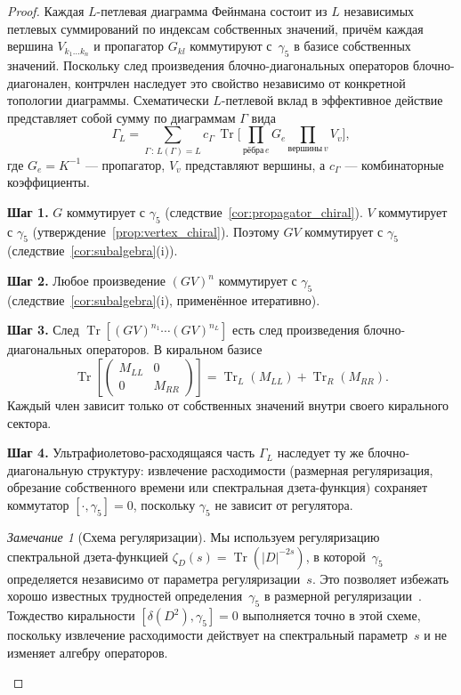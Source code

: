 \documentclass[12pt,a4paper]{article}
\theoremstyle{definition}
\theoremstyle{remark}
\newtheorem{remark}[theorem]{Замечание}
\newcommand{\Tr}{\operatorname{Tr}}
\begin{document}
\begin{proof}
Каждая $L$-петлевая диаграмма Фейнмана состоит из $L$ независимых
петлевых суммирований по индексам собственных значений, причём каждая
вершина $V_{k_1 \ldots k_n}$ и пропагатор $G_{kl}$ коммутируют
с~$\gamma_5$ в базисе собственных значений.  Поскольку след
произведения блочно-диагональных операторов блочно-диагонален,
контрчлен наследует это свойство независимо от конкретной топологии
диаграммы.  Схематически $L$-петлевой вклад в эффективное действие
представляет собой сумму по диаграммам $\Gamma$ вида
\begin{equation}\label{eq:L_loop}
  \Gamma_L = \sum_{\Gamma\,:\,L(\Gamma)=L}
  c_\Gamma\,\Tr\!\bigl[\prod_{\text{рёбра}\,e} G_e
  \prod_{\text{вершины}\,v} V_v\bigr],
\end{equation}
где $G_e = K^{-1}$ --- пропагатор, $V_v$ представляют вершины, а
$c_\Gamma$ --- комбинаторные коэффициенты.

\medskip\noindent\textbf{Шаг 1.}
$G$ коммутирует с $\gamma_5$ (следствие~\ref{cor:propagator_chiral}).
$V$ коммутирует с $\gamma_5$ (утверждение~\ref{prop:vertex_chiral}).
Поэтому $GV$ коммутирует с $\gamma_5$
(следствие~\ref{cor:subalgebra}(i)).

\medskip\noindent\textbf{Шаг 2.}
Любое произведение $(GV)^n$ коммутирует с $\gamma_5$
(следствие~\ref{cor:subalgebra}(i), применённое итеративно).

\medskip\noindent\textbf{Шаг 3.}
След $\Tr[(GV)^{n_1}\cdots(GV)^{n_L}]$ есть след произведения
блочно-диагональных операторов.  В киральном базисе
\begin{equation}\label{eq:block_trace}
  \Tr\!\left[\begin{pmatrix} M_{LL} & 0 \\ 0 & M_{RR}\end{pmatrix}\right]
  = \Tr_L(M_{LL}) + \Tr_R(M_{RR}).
\end{equation}
Каждый член зависит только от собственных значений внутри своего
кирального сектора.

\medskip\noindent\textbf{Шаг 4.}
Ультрафиолетово-расходящаяся часть $\Gamma_L$ наследует ту же
блочно-диагональную структуру: извлечение расходимости (размерная
регуляризация, обрезание собственного времени или спектральная
дзета-функция) сохраняет коммутатор $[\cdot, \gamma_5] = 0$, поскольку
$\gamma_5$ не зависит от регулятора.

\begin{remark}[Схема регуляризации]\label{rem:regularization}
Мы используем регуляризацию спектральной дзета-функцией
$\zeta_D(s) = \Tr(|D|^{-2s})$, в которой~$\gamma_5$ определяется
независимо от параметра регуляризации~$s$.  Это позволяет избежать
хорошо известных трудностей определения~$\gamma_5$ в размерной
регуляризации~\cite{Jegerlehner:2000dz}.  Тождество киральности
$[\delta(D^2), \gamma_5] = 0$ выполняется точно в этой схеме, поскольку
извлечение расходимости действует на спектральный параметр~$s$ и не
изменяет алгебру операторов.
\end{remark}


\end{proof}
\end{document}
